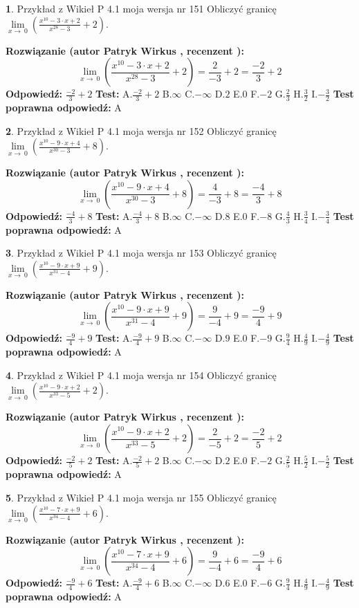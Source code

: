 \documentclass[12pt, a4paper]{article}
\theoremstyle{definition} %
\newtheorem{zad}{}
\newcommand{\zadStart}[1]{\begin{zad}#1\newline}
\newcommand{\zadStop}{\end{zad}}
\newcommand{\rozwStart}[2]{\noindent \textbf{Rozwiązanie (autor #1 , recenzent #2): }\newline}
\newcommand{\rozwStop}{\newline}
\newcommand{\odpStart}{\noindent \textbf{Odpowiedź:}\newline}
\newcommand{\odpStop}{\newline}
\newcommand{\testStart}{\noindent \textbf{Test:}\newline}
\newcommand{\testStop}{\newline}
\newcommand{\kluczStart}{\noindent \textbf{Test poprawna odpowiedź:}\newline}
\newcommand{\kluczStop}{\newline}
\begin{document}
\zadStart{Przykład z Wikieł P 4.1 moja wersja nr 151}
Obliczyć granicę $\lim\limits_{x\to\ 0}(\frac{x^{10}-3 \cdot x +2}{x^{28}-3}+2)$.
\zadStop
\rozwStart{Patryk Wirkus}{}
$$\lim\limits_{x\to\ 0}(\frac{x^{10}-3 \cdot x +2}{x^{28}-3}+2)=\frac{2}{-3}+2=\frac{-2}{3}+2$$
\rozwStop
\odpStart
$\frac{-2}{3}+2$
\odpStop
\testStart
A.$\frac{-2}{3}+2$
B.$\infty$
C.$-\infty$
D.$2$
E.$0$
F.$-2$
G.$\frac{2}{3}$
H.$\frac{3}{2}$
I.$-\frac{3}{2}$
\testStop
\kluczStart
A
\kluczStop



\zadStart{Przykład z Wikieł P 4.1 moja wersja nr 152}
Obliczyć granicę $\lim\limits_{x\to\ 0}(\frac{x^{10}-9 \cdot x +4}{x^{30}-3}+8)$.
\zadStop
\rozwStart{Patryk Wirkus}{}
$$\lim\limits_{x\to\ 0}(\frac{x^{10}-9 \cdot x +4}{x^{30}-3}+8)=\frac{4}{-3}+8=\frac{-4}{3}+8$$
\rozwStop
\odpStart
$\frac{-4}{3}+8$
\odpStop
\testStart
A.$\frac{-4}{3}+8$
B.$\infty$
C.$-\infty$
D.$8$
E.$0$
F.$-8$
G.$\frac{4}{3}$
H.$\frac{3}{4}$
I.$-\frac{3}{4}$
\testStop
\kluczStart
A
\kluczStop



\zadStart{Przykład z Wikieł P 4.1 moja wersja nr 153}
Obliczyć granicę $\lim\limits_{x\to\ 0}(\frac{x^{10}-9 \cdot x +9}{x^{31}-4}+9)$.
\zadStop
\rozwStart{Patryk Wirkus}{}
$$\lim\limits_{x\to\ 0}(\frac{x^{10}-9 \cdot x +9}{x^{31}-4}+9)=\frac{9}{-4}+9=\frac{-9}{4}+9$$
\rozwStop
\odpStart
$\frac{-9}{4}+9$
\odpStop
\testStart
A.$\frac{-9}{4}+9$
B.$\infty$
C.$-\infty$
D.$9$
E.$0$
F.$-9$
G.$\frac{9}{4}$
H.$\frac{4}{9}$
I.$-\frac{4}{9}$
\testStop
\kluczStart
A
\kluczStop



\zadStart{Przykład z Wikieł P 4.1 moja wersja nr 154}
Obliczyć granicę $\lim\limits_{x\to\ 0}(\frac{x^{10}-9 \cdot x +2}{x^{33}-5}+2)$.
\zadStop
\rozwStart{Patryk Wirkus}{}
$$\lim\limits_{x\to\ 0}(\frac{x^{10}-9 \cdot x +2}{x^{33}-5}+2)=\frac{2}{-5}+2=\frac{-2}{5}+2$$
\rozwStop
\odpStart
$\frac{-2}{5}+2$
\odpStop
\testStart
A.$\frac{-2}{5}+2$
B.$\infty$
C.$-\infty$
D.$2$
E.$0$
F.$-2$
G.$\frac{2}{5}$
H.$\frac{5}{2}$
I.$-\frac{5}{2}$
\testStop
\kluczStart
A
\kluczStop



\zadStart{Przykład z Wikieł P 4.1 moja wersja nr 155}
Obliczyć granicę $\lim\limits_{x\to\ 0}(\frac{x^{10}-7 \cdot x +9}{x^{34}-4}+6)$.
\zadStop
\rozwStart{Patryk Wirkus}{}
$$\lim\limits_{x\to\ 0}(\frac{x^{10}-7 \cdot x +9}{x^{34}-4}+6)=\frac{9}{-4}+6=\frac{-9}{4}+6$$
\rozwStop
\odpStart
$\frac{-9}{4}+6$
\odpStop
\testStart
A.$\frac{-9}{4}+6$
B.$\infty$
C.$-\infty$
D.$6$
E.$0$
F.$-6$
G.$\frac{9}{4}$
H.$\frac{4}{9}$
I.$-\frac{4}{9}$
\testStop
\kluczStart
A
\kluczStop
\end{document}
